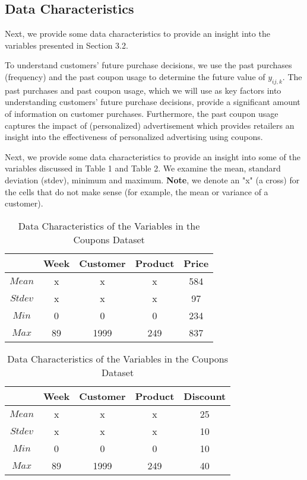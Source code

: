 \subsection{Data Characteristics}
Next, we provide some data characteristics to provide an insight into the
variables presented in Section 3.2.

To understand customers' future purchase decisions, we use the past purchases
(frequency) and the past coupon usage to determine the future value of
$y_{ij,k}$. The past purchases and past coupon usage, which we will use as key factors
into understanding customers' future purchase decisions, provide a significant
amount of information on customer purchases. Furthermore, the past coupon usage
captures the impact of (personalized) advertisement which provides retailers an
insight into the effectiveness of personalized advertising using
coupons.

Next, we provide some data characteristics to provide an insight into some of the
variables discussed in Table 1 and Table 2. We examine the mean, standard
deviation (stdev), minimum and maximum. 
\textbf{Note}, we denote an "x" (a cross) for the cells that do not
make sense (for example, the mean or variance of a customer).

\begin{table}[H]
\parbox{.45\linewidth}{
\centering
\scalebox{0.85}
{
    \begin{tabular}{| c | c | c | c | c |}
    \hline
    & Week & Customer & Product & Price \\
    \hline
    $Mean$ & x & x & x & 584 \\
    \hline
    $Stdev$ & x & x & x & 97 \\
    \hline
    $Min$ & 0 & 0 & 0 & 234 \\
    \hline
    $Max$ & 89 & 1999 & 249 & 837 \\
    \hline
    \end{tabular}
}
\caption{Data Characteristics of the Variables in the Customers/Baskets Dataset}
}
\hfill
\parbox{.50\linewidth}{
\centering
\scalebox{0.85}
{
    \begin{tabular}{| c | c | c | c | c |}
    \hline
    & Week & Customer & Product & Discount \\
    \hline
    $Mean$ & x & x & x & 25 \\
    \hline
    $Stdev$ & x & x & x & 10 \\
    \hline
    $Min$ & 0 & 0 & 0 & 10 \\
    \hline
    $Max$ & 89 & 1999 & 249 & 40 \\
    \hline
    \end{tabular}
}
\caption{Data Characteristics of the Variables in the Coupons Dataset}
}
\end{table}

